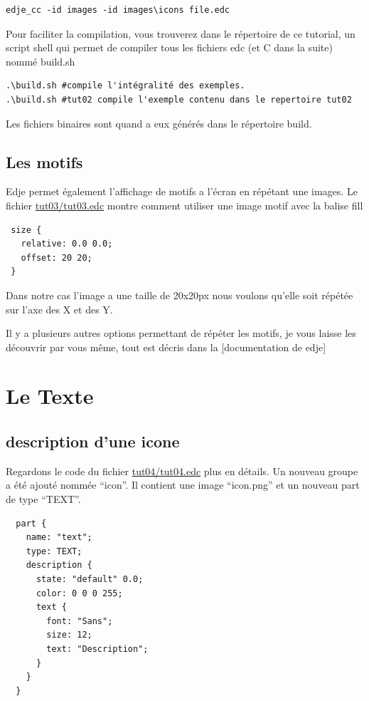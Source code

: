\documentclass[a4paper]{efr}
\begin{document}
\begin{lstlisting}
edje_cc -id images -id images\icons file.edc
\end{lstlisting}

Pour faciliter la compilation, vous trouverez dans le répertoire de ce tutorial,
un script shell qui permet de compiler tous les fichiers edc (et C dans la
suite) nommé build.sh

\begin{lstlisting}
.\build.sh #compile l'intégralité des exemples.
.\build.sh #tut02 compile l'exemple contenu dans le repertoire tut02
\end{lstlisting}

Les fichiers binaires sont quand a eux générés dans le répertoire build.

\subsection{Les motifs}
Edje permet également l'affichage de motifs a l'écran en répétant une images.
Le fichier \href{file://tut03/tut03.edc}{tut03/tut03.edc} montre comment
utiliser une image motif avec la balise fill
\begin{lstlisting}
 size {
   relative: 0.0 0.0;
   offset: 20 20;
 }
\end{lstlisting}

Dans notre cas l'image a une taille de 20x20px nous voulons qu'elle soit répétée
sur l'axe des X et des Y.

Il y a plusieurs autres options permettant de répéter les motifs, je vous laisse
les découvrir par vous même, tout est décris dans la
\href{http://docs.enlightenment.org/auto/edje/edcref.html}[documentation de edje]


\section{Le Texte}

\subsection{description d'une icone}
Regardons le code du fichier \href{file://tut04/tut04.edc}{tut04/tut04.edc} plus
en détails. Un nouveau groupe a été ajouté nommée ``icon''. Il contient une
image ``icon.png'' et un nouveau part de type ``TEXT''.

\begin{lstlisting}
  part {
    name: "text";
    type: TEXT;
    description {
      state: "default" 0.0;
      color: 0 0 0 255;
      text {
        font: "Sans";
        size: 12;
        text: "Description";
      }
    }
  }
\end{lstlisting}
\end{document}
